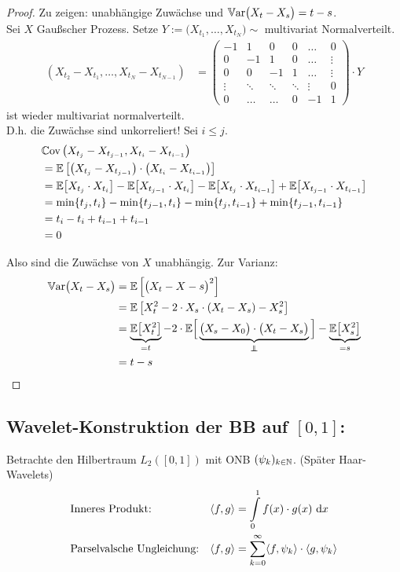 \begin{proof}
	Zu zeigen: unabhängige Zuwächse und $\mathbb{V}\text{ar}\big(X_t-X_s\big)=t-s$.\\
	Sei $X$ Gaußscher Prozess. 
	Setze $Y:=\big(X_{t_1},\ldots,X_{t_N}\big)\sim$ multivariat Normalverteilt.
	\begin{align*}
		\left(X_{t_2}-X_{t_1},\ldots,X_{t_N}-X_{t_{N-1}}\right)
		&=\begin{pmatrix}
			-1 & 1 & 0 & 0 & \hdots & 0\\
			0 & -1 & 1 & 0 & \hdots & \vdots\\
			0 & 0 & -1 & 1 & \hdots & \vdots\\
			\vdots & \ddots & \ddots & \ddots & \vdots & 0\\
			0 & \hdots & \hdots & 0 & -1 & 1
		\end{pmatrix}\cdot Y
	\end{align*}
	ist wieder multivariat normalverteilt.\\
	D.h. die Zuwächse sind unkorreliert!
	Sei $i\leq j$.
	\begin{align*}
		&\mathbb{C}\text{ov}\left(X_{t_j}-X_{t_{j-1}},X_{t_i}-X_{t_{i-1}}\right)\\
		&=\mathbb{E}\left[\left(X_{t_j}-X_{t_{j-1}}\right)\cdot\left(X_{t_i}-X_{t_{i-1}}\right)\right]\\
		&=\mathbb{E}\big[X_{t_j}\cdot X_{t_i}\big]-\mathbb{E}\big[X_{t_{j-1}}\cdot X_{t_i}\big]-\mathbb{E}\big[X_{t_j}\cdot X_{t_{i-1}}\big]+\mathbb{E}\big[X_{t_{j-1}}\cdot X_{t_{i-1}}\big]\\
		&=\min\lbrace t_j,t_i\rbrace-\min\lbrace t_{j-1},t_i\rbrace-\min\lbrace t_j,t_{i-1}\rbrace+\min\lbrace t_{j-1},t_{i-1}\rbrace\\
		&=t_i-t_i+t_{i-1}+t_{i-1}\\
		&=0
	\end{align*}
	
	Also sind die Zuwächse von $X$ unabhängig.
	Zur Varianz:
	\begin{align*}
		\Var\big(X_t-X_s\big)
		&=\E\left[\big(X_t-X-s\big)^2\right]\\
		&=\E\left[X_t^2-2\cdot X_s\cdot (X_t-X_s)-X_s^2\right]\\
		&=\underbrace{\E\big[X_t^2\big]}_{=t}-2\cdot\E\Big[\underbrace{\big(X_s-X_0\big)\cdot\big(X_t-X_s\big)}_{\unab}\Big]-\underbrace{\E\big[X_s^2\big]}_{=s}\\
		&=t-s
	\end{align*}
\end{proof}

\subsection*{\textbf{Wavelet-Konstruktion} der BB auf $[0,1]$:}
Betrachte den Hilbertraum $L_2([0,1])$ mit ONB $(\psi_k)_{k\in\mathbb{N}}$. (Später Haar-Wavelets)
\begin{align*}
	&\text{Inneres Produkt:} &\langle f,g\rangle&=\int\limits_0^1 f(x)\cdot g(x)\text{ d} x\\
	&\text{Parselvalsche Ungleichung:} &\langle f,g\rangle&=\sum\limits_{k=0}^\infty\langle f,\psi_k\rangle\cdot\langle g,\psi_k\rangle
\end{align*}

